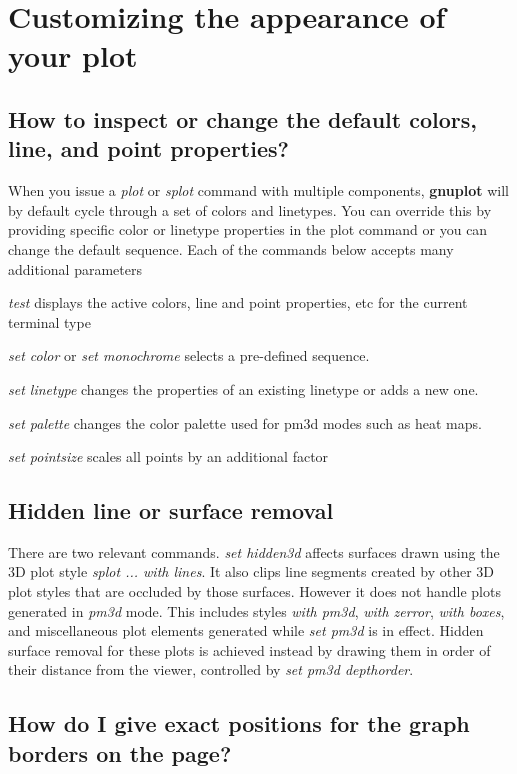 \documentclass[a4paper,11pt]{article}
\newcommand{\gnuplot}{\textbf{gnuplot }}
\begin{document}
\section{Customizing the appearance of your plot}

\subsection{How to inspect or change the default colors, line, and point properties?}

When you issue a {\em plot} or {\em splot} command with multiple components,
\gnuplot will by default cycle through a set of colors and linetypes.
You can override this by providing specific color or linetype properties in the
plot command or you can change the default sequence.
Each of the commands below accepts many additional parameters
\begin{list}{}{}
  \item
  {\em test} displays the active colors, line and point properties, etc
             for the current terminal type
  \item
  {\em set color} or {\em set monochrome} selects a pre-defined sequence.
  \item
  {\em set linetype} changes the properties of an existing linetype or adds a new one.
  \item
  {\em set palette} changes the color palette used for pm3d modes such as heat maps.
  \item
  {\em set pointsize} scales all points by an additional factor
\end{list}

\subsection{Hidden line or surface removal}

There are two relevant commands. {\em set hidden3d} affects surfaces
drawn using the 3D plot style {\em splot ... with lines}. It also clips
line segments created by other 3D plot styles that are occluded by those
surfaces.   However it does not handle plots generated in {\em pm3d} mode.
This includes styles {\em with pm3d}, {\em with zerror}, {\em with boxes},
and miscellaneous plot elements generated while {\em set pm3d} is in effect.
Hidden surface removal for these plots is achieved instead by drawing them
in order of their distance from the viewer, controlled by
{\em set pm3d depthorder}.

\subsection{How do I give exact positions for the graph borders on the page?}
\end{document}
